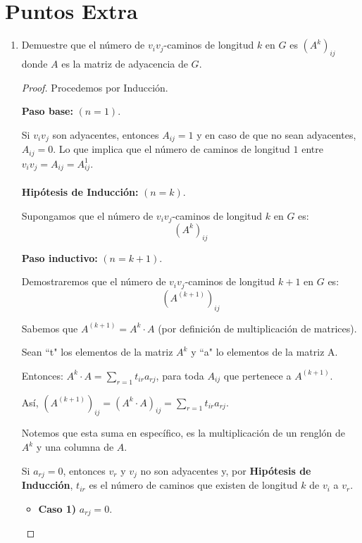 \documentclass{article}
\begin{document}
  \section*{Puntos Extra}
  \begin{enumerate}
    \item Demuestre que el n\'umero de $v_i v_j$-caminos de longitud $k$ en $G$ es
      $(A^k)_{ij}$ donde $A$ es la matriz de adyacencia de $G$.

      \renewcommand\qedsymbol{QED}
      \begin{proof}
        Procedemos por Inducción.

        \textbf{Paso base:} $(n = 1)$.

        Si $v_i v_j$ son adyacentes, entonces $A_{ij}=1$ y en caso de que no sean
        adyacentes, $A_{ij} = 0$. Lo que implica que el n\'umero de caminos
        de longitud $1$ entre $v_i v_j = A_{ij} = A^{1}_{ij}$. \\
        \\
        \textbf{Hipótesis de Inducción:} $(n = k)$.

        Supongamos que el número de $v_i v_j$-caminos de longitud $k$ en $G$ es:
        $$(A^k)_{ij}$$

        \textbf{Paso inductivo:} $(n = k+1)$.

        Demostraremos que el número de $v_i v_j$-caminos de longitud $k+1$ en $G$ es:
        $$(A^{(k+1)})_{ij}$$

        Sabemos que $A^{(k+1)} = A^k \cdot A$ (por definición de multiplicación de matrices).

        Sean ``t" los elementos de la matriz $A^k$ y ``a" lo elementos de la matriz A.

        Entonces: $A^k \cdot A = \displaystyle \sum_{r=1} t_{ir} a_{rj}$, para toda $A_{ij}$ que pertenece a
        $A^{(k+1)}$.

        Así, $(A^{(k+1)})_{ij} = (A^k \cdot A)_{ij} = \displaystyle \sum_{r=1} t_{ir}a_{rj}$.

        Notemos que esta suma en espec\'ifico, es la multiplicación de un renglón de $A^k$ y una columna de $A$.

        Si $a_{rj} = 0$, entonces $v_r$ y $v_j$ no son adyacentes y, por
        \textbf{Hipótesis de Inducción}, $t_{ir}$ es el número de caminos que existen de longitud $k$
        de $v_i$ a $v_r$.

        \begin{itemize}
          \item \textbf{Caso 1)} $a_{rj} = 0$.


\end{itemize}
\end{proof}
\end{enumerate}
\end{document}
